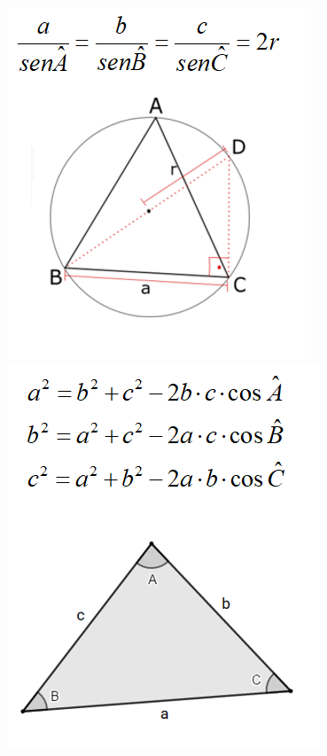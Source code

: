     
    \begin{figure}[ht]
    \begin{center}
    \begin{minipage}{.48\textwidth}
        \centering
        \includegraphics[scale=0.7]{imgs/leidossenos.png}
    \end{minipage}
    \begin{minipage}{.48\textwidth}
    \centering
        \includegraphics[scale=0.7]{imgs/leidoscosenos.png}
    \end{minipage}
    \end{center}
    \end{figure}
